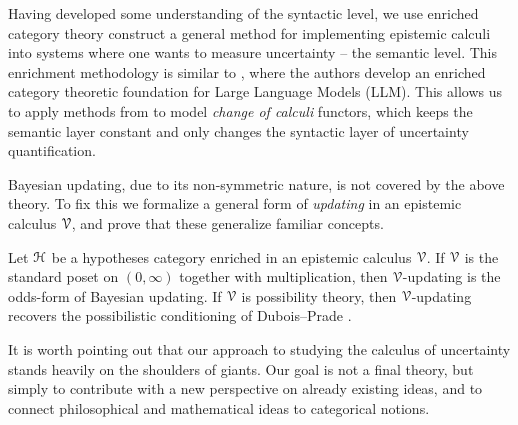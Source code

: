 Having developed some understanding of the syntactic level, we use enriched category theory construct a general method for implementing epistemic calculi into systems where one wants to measure uncertainty -- the semantic level. This enrichment methodology is similar to \cite{bradley-terilla-vlassopoulos_2022}, where the authors develop an enriched category theoretic foundation for Large Language Models (LLM). This allows us to apply methods from \cite{kelly_1982} to model \emph{change of calculi} functors, which keeps the semantic layer constant and only changes the syntactic layer of uncertainty quantification. 

Bayesian updating, due to its non-symmetric nature, is not covered by the above theory. To fix this we formalize a general form of \emph{updating} in an epistemic calculus $\EuScript{V}$, and prove that these generalize familiar concepts. 

\begin{introthm}
    Let $\EuScript{H}$ be a hypotheses category enriched in an epistemic calculus $\EuScript{V}$. If $\EuScript{V}$ is the standard poset on $(0,\infty)$ together with multiplication, then $\EuScript{V}$-updating is the odds-form of Bayesian updating. If $\EuScript{V}$ is possibility theory, then $\EuScript{V}$-updating recovers the possibilistic conditioning of Dubois--Prade \cite{dubois-prade_1990}.
\end{introthm}

It is worth pointing out that our approach to studying the calculus of uncertainty stands heavily on the shoulders of giants. Our goal is not a final theory, but simply to contribute with a new perspective on already existing ideas, and to connect philosophical and mathematical ideas to categorical notions. 









